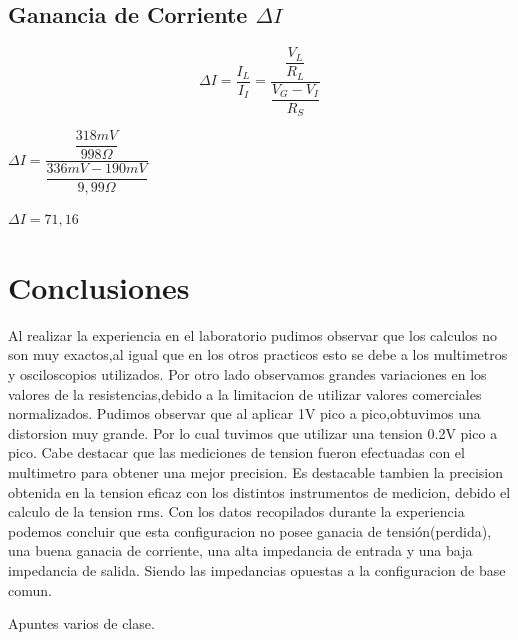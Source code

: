 \documentclass[12pt]{article}
\begin{document}
\subsection{Ganancia de Corriente $\Delta I$}
\begin{equation}
  \Delta I=\frac{I_L}{I_I}=\dfrac{\dfrac{V_L}{R_L}}{\dfrac{V_G-V_I}{R_S}}
\end{equation}
\vspace{0.2cm}
\begin{center}
$\Delta I=\dfrac{\dfrac{318mV}{998\Omega}}{\dfrac{336mV-190mV}{9,99\Omega}}$

$\Delta I=71,16$
\end{center}


\section{Conclusiones}
Al realizar la experiencia en el laboratorio pudimos observar que los calculos no son muy exactos,al igual que en los otros practicos esto se debe a los multimetros y osciloscopios utilizados. Por otro lado observamos grandes variaciones en los valores de la resistencias,debido a la limitacion de utilizar valores comerciales normalizados.
Pudimos observar que al aplicar 1V pico a pico,obtuvimos una distorsion muy grande. Por lo cual tuvimos que utilizar una tension 0.2V pico a pico.
Cabe destacar que las mediciones de tension fueron efectuadas con el multimetro para obtener una mejor precision. Es destacable tambien la precision obtenida en la tension eficaz con los distintos instrumentos de medicion, debido el calculo de la tension rms.
Con los datos recopilados durante la experiencia podemos concluir que esta configuracion no posee ganacia de tensión(perdida), una buena ganacia de corriente, una alta impedancia de entrada y una baja impedancia de salida.
Siendo las impedancias opuestas a la configuracion de base comun.


Apuntes varios de clase.
\end{document}
